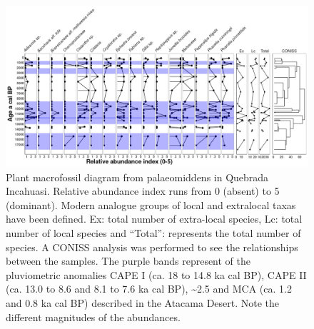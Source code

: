\documentclass[
  authoryear,
  preprint,
  3p]{elsarticle}
\begin{document}
\begin{figure}

{\centering \includegraphics{Fig_3.png}

}

\caption{\label{fig-3}Plant macrofossil diagram from palaeomiddens in
Quebrada Incahuasi. Relative abundance index runs from 0 (absent) to 5
(dominant). Modern analogue groups of local and extralocal taxas have
been defined. Ex: total number of extra-local species, Lc: total number
of local species and ``Total'': represents the total number of species.
A CONISS analysis was performed to see the relationships between the
samples. The purple bands represent of the pluviometric anomalies CAPE I
(ca. 18 to 14.8 ka cal BP), CAPE II (ca. 13.0 to 8.6 and 8.1 to 7.6 ka
cal BP), \textasciitilde2.5 and MCA (ca. 1.2 and 0.8 ka cal BP)
described in the Atacama Desert. Note the different magnitudes of the
abundances.}

\end{figure}
\end{document}
